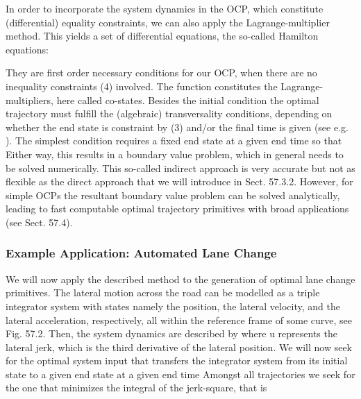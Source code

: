 In order to incorporate the system dynamics in the OCP, which constitute (differential) equality constraints, we can also apply the Lagrange-multiplier method. This yields a set of differential equations, the so-called Hamilton equations:


They are first order necessary conditions for our OCP, when there are no inequality constraints (4) involved. The function 
constitutes the Lagrange-multipliers, here called co-states. Besides the initial condition
the optimal trajectory must fulfill the (algebraic) transversality conditions, depending on whether the end state 
is constraint by (3) and/or the final time 
is given (see e.g. \cite{Lewis_OC}). The simplest condition requires a fixed end state 
at a given end time 
so that
Either way, this results in a boundary value problem, which in general needs to be solved numerically. This so-called indirect approach is very accurate but not as flexible as the direct approach that we will introduce in Sect. 57.3.2. However, for simple OCPs the resultant boundary value problem can be solved analytically, leading to fast computable optimal trajectory primitives with broad applications (see Sect. 57.4).

\subsubsection{Example Application: Automated Lane Change}\label{sec:example_application_ALC}

We will now apply the described method to the generation of optimal lane change primitives. The lateral motion across the road can be modelled as a triple integrator system with states 
namely the position, the lateral velocity, and the lateral acceleration, respectively, all within the reference frame of some curve, see Fig. 57.2.
Then, the system dynamics are described by 
where u represents the lateral jerk, which is the third derivative of the lateral position. We will now seek for the optimal system input %
that transfers the integrator system from its initial state
 to a given end state 
at a given end time 
Amongst all trajectories we seek for the one that minimizes the integral of the jerk-square, that is

